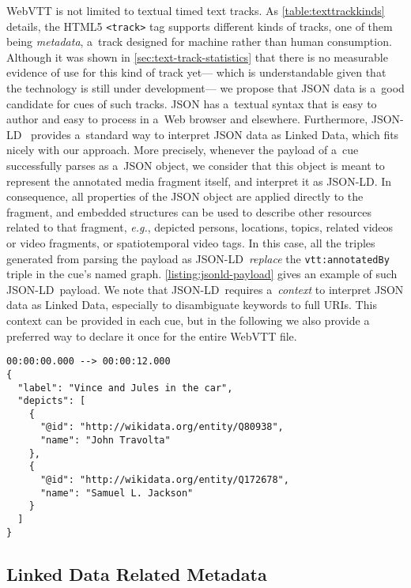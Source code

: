 \documentclass{sig-alternate}
\newcommand{\vtt}[1]{\texttt{vtt:#1}}
\def\JSONLD{\mbox{JSON-LD}}
\begin{document}
WebVTT is not limited to textual timed text tracks.
As \autoref{table:texttrackkinds} details, the HTML5
\texttt{<track>} tag supports different kinds of tracks,
one of them being \textit{metadata},
a~track designed for machine rather than human consumption.
Although it was shown in \autoref{sec:text-track-statistics}
that there is no measurable evidence of use for this kind of track yet---%
which is understandable given that the technology
is still under development---%
we propose that JSON data is a~good candidate for cues of such tracks.
JSON has a~textual syntax that is easy to author
and easy to process in a~Web browser and elsewhere.
Furthermore, \JSONLD~\cite{sporny2013jsonld} provides
a~standard way to interpret JSON data as Linked Data,
which fits nicely with our approach.
More precisely, whenever the payload of a~cue
successfully parses as a~JSON object,
we consider that this object is meant to
represent the annotated media fragment itself,
and interpret it as \JSONLD.
In consequence, all properties of the JSON object
are applied directly to the fragment,
and embedded structures can be used to describe
other resources related to that fragment,
\emph{e.g.}, depicted persons, locations, topics, related videos
or video fragments, or spatiotemporal video tags.
In this case, all the triples generated from parsing the payload as \JSONLD\
\emph{replace} the \vtt{annotatedBy} triple in the cue's named graph.
\autoref{listing:jsonld-payload} gives an example of such \JSONLD\ payload.
We note that \JSONLD\ requires a~\emph{context}
to interpret JSON data as Linked Data,
especially to disambiguate keywords to full URIs.
This context can be provided in each cue,
but in the following we also provide a preferred way to declare it once
for the entire WebVTT file.

\begin{lstlisting}[caption={A~WebVTT cue with a~\JSONLD\ payload},
  label=listing:jsonld-payload, float=t!]
00:00:00.000 --> 00:00:12.000
{
  "label": "Vince and Jules in the car",
  "depicts": [
    {
      "@id": "http://wikidata.org/entity/Q80938",
      "name": "John Travolta"
    },
    {
      "@id": "http://wikidata.org/entity/Q172678",
      "name": "Samuel L. Jackson"
    }
  ]
}
\end{lstlisting}

\subsection{Linked Data Related Metadata}
\end{document}
